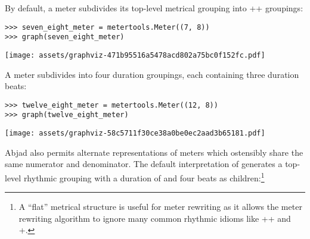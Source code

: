 \noindent By default, a  meter subdivides its top-level metrical
grouping into ++ groupings:

\begin{comment}
<abjad>
seven_eight_meter = metertools.Meter((7, 8))
graph(seven_eight_meter)
</abjad>
\end{comment}

\begin{abjadbookoutput}
\begin{singlespacing}
\vspace{-0.5\baselineskip}
\begin{verbatim}
>>> seven_eight_meter = metertools.Meter((7, 8))
>>> graph(seven_eight_meter)
\end{verbatim}
\noindent\texttt{[image: assets/graphviz-471b95516a5478acd802a75bc0f152fc.pdf]}
\end{singlespacing}
\end{abjadbookoutput}

\noindent A  meter subdivides into four  duration
groupings, each containing three  duration beats:

\begin{comment}
<abjad>
twelve_eight_meter = metertools.Meter((12, 8))
graph(twelve_eight_meter)
</abjad>
\end{comment}

\begin{abjadbookoutput}
\begin{singlespacing}
\vspace{-0.5\baselineskip}
\begin{verbatim}
>>> twelve_eight_meter = metertools.Meter((12, 8))
>>> graph(twelve_eight_meter)
\end{verbatim}
\noindent\texttt{[image: assets/graphviz-58c5711f30ce38a0be0ec2aad3b65181.pdf]}
\end{singlespacing}
\end{abjadbookoutput}

\noindent Abjad also permits alternate representations of meters which
ostensibly share the same numerator and denominator. The default interpretation
of  generates a top-level rhythmic grouping with a duration of
 and four  beats as children:\footnote{A \enquote{flat}
 metrical structure is useful for meter rewriting as it allows the
meter rewriting algorithm to ignore many common rhythmic idioms like
++ and +.}

